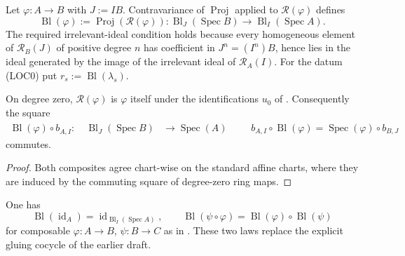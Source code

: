\begin{definition}
  \label{def:nagata-affine-blowup-restriction-map}
  \leanok

  Let $\varphi\colon A\to B$ with $J:=IB$.  Contravariance of
  $\operatorname{Proj}$ applied to $\mathcal R(\varphi)$ defines
  \[
    \operatorname{Bl}(\varphi):=\operatorname{Proj}(\mathcal R(\varphi))
    \colon\operatorname{Bl}_J(\operatorname{Spec}B)
    \longrightarrow\operatorname{Bl}_I(\operatorname{Spec}A).
  \]
  The required irrelevant-ideal condition holds because every homogeneous
  element of $\mathcal R_B(J)$ of positive degree $n$ has coefficient in
  $J^n=(I^n)B$, hence lies in the ideal generated by the image of the
  irrelevant ideal of $\mathcal R_A(I)$.  For the datum (LOC0) put
  $r_s:=\operatorname{Bl}(\lambda_s)$.
\end{definition}

\begin{lemma}
  \label{lemma:nagata-rees-localization-degree-zero}
  \leanok

  On degree zero, $\mathcal R(\varphi)$ is $\varphi$ itself under the
  identifications $u_0$ of .
  Consequently the square
  \[
  \begin{aligned}
    \operatorname{Bl}(\varphi)\circ b_{A,I}^{\phantom{1}}
    \colon\quad
    \operatorname{Bl}_J(\operatorname{Spec}B)
    &\longrightarrow\operatorname{Spec}(A)
  \end{aligned}
  \qquad
    b_{A,I}\circ\operatorname{Bl}(\varphi)
      =\operatorname{Spec}(\varphi)\circ b_{B,J}
  \]
  commutes.
\end{lemma}

\begin{proof}
  \leanok
  Both composites agree chart-wise on the standard affine charts, where
  they are induced by the commuting square of degree-zero ring maps.
\end{proof}

\begin{lemma}
  \label{lemma:nagata-affine-blowup-restrict-cocycle}
  \leanok

  One has
  \[
    \operatorname{Bl}(\operatorname{id}_A)
      =\operatorname{id}_{\operatorname{Bl}_I(\operatorname{Spec}A)},
    \qquad
    \operatorname{Bl}(\psi\circ\varphi)
      =\operatorname{Bl}(\varphi)\circ\operatorname{Bl}(\psi)
  \]
  for composable $\varphi\colon A\to B$, $\psi\colon B\to C$ as in
  .  These two laws replace the
  explicit gluing cocycle of the earlier draft.
\end{lemma}

